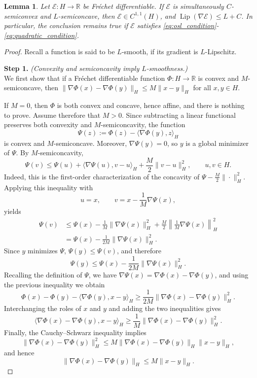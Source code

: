\documentclass[10pt,a4paper]{amsart}
\newtheorem{lemma}{Lemma}
\begin{document}
\begin{lemma}
Let $\mathscr{E}:H\to\mathbb R$ be Fr\'echet differentiable. If $\mathscr{E}$ is simultaneously $C$-semiconvex and $L$-semiconcave, then $\mathscr{E}\in C^{1,1}(H)$,  and $\operatorname{Lip}(\nabla\mathscr{E}) \le L+C$. In particular, the conclusion remains true if $\mathscr{E}$ satisfies \eqref{eq:osl_condition}-\eqref{eq:quadratic_condition}.
\end{lemma}

\begin{proof}
Recall a function is said to be $L$-smooth, if its gradient is $L$-Lipschitz. 

\textbf{Step 1.} \textit{(Convexity and semiconcavity imply $L$-smoothness.)}\\
We first show that if a Fr\'echet differentiable function
$\Phi:H\to\mathbb R$ is convex and $M$-semiconcave, then $\|\nabla\Phi(x)-\nabla\Phi(y)\|_H \le M\|x-y\|_H$ for all $x,y\in H.$

If $M=0$, then $\Phi$ is both convex and concave, hence affine, and there is nothing to prove. Assume therefore that $M>0$. Since subtracting a linear functional preserves both convexity and $M$-semiconcavity, the function
\[
\Psi(z):=\Phi(z)-\langle\nabla\Phi(y),z\rangle_H
\]
is convex and $M$-semiconcave. Moreover, $\nabla\Psi(y)=0$,  so  $y$ is a global minimizer of $\Psi$. By $M$-semiconcavity,
\[
\Psi(v) \le \Psi(u) + \langle\nabla\Psi(u),v-u\rangle_H + \frac{M}{2}\|v-u\|_H^2, \qquad u,v\in H.
\]
Indeed, this is the first-order characterization of the concavity of
$\Psi-\frac{M}{2}\|\cdot\|_H^2$. Applying this inequality with
\[
u=x, \qquad v=x-\frac1M\nabla\Psi(x),
\]
yields
\[
\begin{aligned}
    \Psi(v)
    & \le \Psi(x) - \frac{1}{M}\|\nabla\Psi(x)\|_H^2 + \frac{M}{2} \left\| \frac1M\nabla\Psi(x) \right\|_H^2 \\
    & = \Psi(x) - \frac{1}{2M} \|\nabla\Psi(x)\|_H^2.
\end{aligned}
\]
Since $y$ minimizes $\Psi$, $\Psi(y)\le\Psi(v)$, and therefore
\[
\Psi(y) \le \Psi(x) - \frac1{2M} \|\nabla\Psi(x)\|_H^2.
\]
Recalling the definition of $\Psi$, we have $\nabla \Psi(x) = \nabla \Phi(x) - \nabla \Phi(y)$, and using the previous inequality we obtain
\[
\Phi(x)-\Phi(y) - \langle\nabla\Phi(y),x-y\rangle_H \ge \frac{1}{2M} \|\nabla\Phi(x)-\nabla\Phi(y)\|_H^2.
\]
Interchanging the roles of $x$ and $y$ and adding the two inequalities
gives
\[
\langle \nabla\Phi(x)-\nabla\Phi(y), x-y \rangle_H \ge \frac{1}{M} \|\nabla\Phi(x)-\nabla\Phi(y)\|_H^2.
\]
Finally, the Cauchy--Schwarz inequality implies
\[
\|\nabla\Phi(x)-\nabla\Phi(y)\|_H^2 \le M \|\nabla\Phi(x)-\nabla\Phi(y)\|_H \|x-y\|_H,
\]
and hence
\[
\|\nabla\Phi(x)-\nabla\Phi(y)\|_H \le M\|x-y\|_H.
\]


\end{proof}
\end{document}
